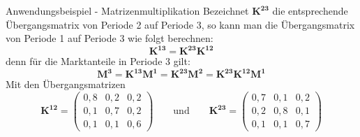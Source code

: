 \begin{frame}{Anwendungsbeispiel - Matrizenmultiplikation}
	Bezeichnet $\pmb{K^{23}}$ die entsprechende Übergangsmatrix von Periode 2 auf Periode 3, so kann man die Übergangsmatrix von Periode 1 auf Periode 3 wie folgt berechnen:
	\[
		\pmb{K^{13}} = \pmb{K^{23}} \pmb{K^{12}}
	\]
	denn für die Marktanteile in Periode 3 gilt:
	\[
	\pmb{M^{3}}  = \pmb{K^{13}} \pmb{M^{1}} = \pmb{K^{23}} \pmb{M^{2}} = \pmb{K^{23}} \pmb{K^{12}} \pmb{M^{1}}
	\]
		Mit den Übergangsmatrizen
		\[
		\pmb{K^{12}} = \begin{pmatrix}
		0,8 & 0,2 & 0,2 \\
		0,1 & 0,7 & 0,2 \\
		0,1 & 0,1 & 0,6
		\end{pmatrix} \qquad \mbox{und} \qquad 	\pmb{K^{23}} = \begin{pmatrix}
		0,7 & 0,1 & 0,2 \\
		0,2 & 0,8 & 0,1 \\
		0,1 & 0,1 & 0,7
		\end{pmatrix}
		\]
		
\end{frame}

